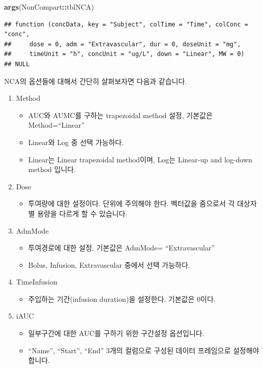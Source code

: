 \documentclass[]{krantz}
\makeatletter
\newenvironment{Shaded}{\begin{snugshade}}{\end{snugshade}}
\newcommand{\KeywordTok}[1]{\textcolor[rgb]{0.13,0.29,0.53}{\textbf{#1}}}
\newcommand{\OperatorTok}[1]{\textcolor[rgb]{0.81,0.36,0.00}{\textbf{#1}}}
\newcommand{\NormalTok}[1]{#1}
\providecommand{\tightlist}{%
  \setlength{\itemsep}{0pt}\setlength{\parskip}{0pt}}
\newenvironment{kframe}{%
\medskip{}
\setlength{\fboxsep}{.8em}
 \def\at@end@of@kframe{}%
 \ifinner\ifhmode%
  \def\at@end@of@kframe{\end{minipage}}%
  \begin{minipage}{\columnwidth}%
 \fi\fi%
 \def\FrameCommand##1{\hskip\@totalleftmargin \hskip-\fboxsep
 \colorbox{shadecolor}{##1}\hskip-\fboxsep
     \hskip-\linewidth \hskip-\@totalleftmargin \hskip\columnwidth}%
 \MakeFramed {\advance\hsize-\width
   \@totalleftmargin\z@ \linewidth\hsize
   \@setminipage}}%
 {\par\unskip\endMakeFramed%
 \at@end@of@kframe}
\renewenvironment{Shaded}{\begin{kframe}}{\end{kframe}}
\theoremstyle{definition}
\theoremstyle{definition}
\theoremstyle{definition}
\theoremstyle{remark}
\makeatother
\begin{document}
\begin{Shaded}
\begin{Highlighting}[]
\KeywordTok{args}\NormalTok{(NonCompart}\OperatorTok{::}\NormalTok{tblNCA)}
\end{Highlighting}
\end{Shaded}

\begin{verbatim}
## function (concData, key = "Subject", colTime = "Time", colConc = "conc", 
##     dose = 0, adm = "Extravascular", dur = 0, doseUnit = "mg", 
##     timeUnit = "h", concUnit = "ug/L", down = "Linear", MW = 0) 
## NULL
\end{verbatim}

NCA의 옵션들에 대해서 간단히 살펴보자면 다음과 같습니다.

\begin{enumerate}
\def\labelenumi{\arabic{enumi}.}
\tightlist
\item
  Method

  \begin{itemize}
  \tightlist
  \item
    AUC와 AUMC를 구하는 trapezoidal method 설정, 기본값은
    Method=``Linear''
  \item
    Linear와 Log 중 선택 가능하다.
  \item
    Linear는 Linear trapezoidal method이며, Log는 Linear-up and log-down
    method 입니다.
  \end{itemize}
\item
  Dose

  \begin{itemize}
  \tightlist
  \item
    투여량에 대한 설정이다. 단위에 주의해야 한다. 벡터값을 줌으로서 각
    대상자별 용량을 다르게 할 수 있습니다.
  \end{itemize}
\item
  AdmMode

  \begin{itemize}
  \tightlist
  \item
    투여경로에 대한 설정, 기본값은 AdmMode= ``Extravascular''
  \item
    Bolus, Infusion, Extravascular 중에서 선택 가능하다.
  \end{itemize}
\item
  TimeInfusion

  \begin{itemize}
  \tightlist
  \item
    주입하는 기간(infusion duration)을 설정한다. 기본값은 0이다.
  \end{itemize}
\item
  iAUC

  \begin{itemize}
  \tightlist
  \item
    일부구간에 대한 AUC를 구하기 위한 구간설정 옵션입니다.
  \item
    ``Name'', ``Start'', ``End'' 3개의 컬럼으로 구성된 데이터 프레임으로
    설정해야 합니다.
  \end{itemize}
\end{enumerate}
\end{document}
